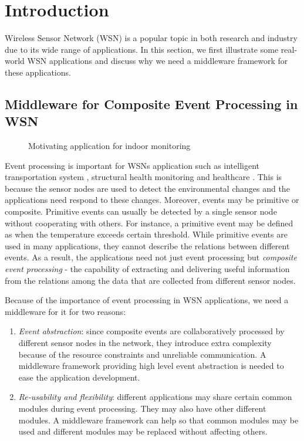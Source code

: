 \section{Introduction}
\label{sec:introduction}
Wireless Sensor Network (WSN) is a popular topic in both research and industry due to its wide range of applications. In this section, we first illustrate some real-world WSN applications and discuss why we need a middleware framework for these applications.

\subsection{Middleware for Composite Event Processing in WSN}

\begin{figure}
\centering
{}
\caption{Motivating application for indoor monitoring}
\label{fig:rooms}
\end{figure}

Event processing is important for WSNs application such as intelligent transportation system \cite{klein:its}, structural health monitoring \cite{lynch:shm} and healthcare \cite{lo:ban}. This is because the sensor nodes are used to detect the environmental changes and the applications need respond to these changes. Moreover, events may be primitive or composite. Primitive events can usually be detected by a single sensor node without cooperating with others. For instance, a primitive event may be defined as when the temperature exceeds certain threshold. While primitive events are used in many applications, they cannot describe the relations between different events. As a result, the applications need not just event processing but \emph{composite event processing} - the capability of extracting and delivering useful information from the relations among the data that are collected from different sensor nodes.

Because of the importance of event processing in WSN applications, we need a middleware for it for two reasons:
\begin{enumerate}
\item \emph{Event abstraction}: since composite events are collaboratively processed by different sensor nodes in the network, they introduce extra complexity because of the resource constraints and unreliable communication. A middleware framework providing high level event abstraction is needed to ease the application development.
\item \emph{Re-usability and flexibility}: different applications may share certain common modules during event processing. They may also have other different modules. A middleware framework can help so that common modules may be used and different modules may be replaced without affecting others.
\end{enumerate}

